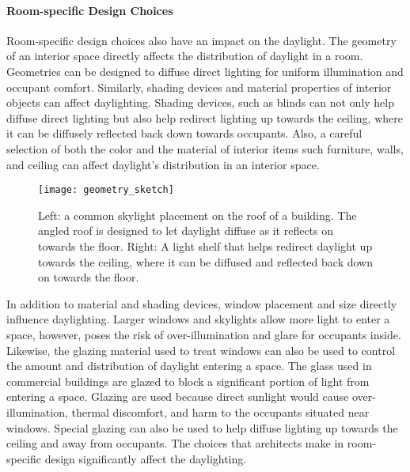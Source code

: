     \paragraph{Room-specific Design Choices} 

    Room-specific design choices also have an impact on the daylight.
    The geometry of an interior space directly affects the distribution of daylight in a room.
    Geometries can be designed to diffuse direct lighting for uniform illumination and occupant comfort.
    Similarly, shading devices and material properties of interior objects can affect daylighting.
    Shading devices, such as blinds can not only help diffuse direct lighting but also help redirect lighting up towards the ceiling, where it can be diffusely reflected back down towards occupants.
    Also, a careful selection of both the color and the material of interior items such furniture, walls, and ceiling can affect daylight's distribution in an interior space. 

    \begin{figure}[h]
      \centering
      \texttt{[image: geometry\_sketch]}
      \caption{Left: a common skylight placement on the roof of a building. The angled roof is designed to let daylight diffuse as it reflects on towards the floor. Right: A light shelf that helps redirect daylight up towards the ceiling, where it can be diffused and reflected back down on towards the floor.}
      \label{fig:geometry_sketch}
    \end{figure}

    In addition to material and shading devices, window placement and size directly influence daylighting.
    Larger windows and skylights allow more light to enter a space, however, poses the risk of over-illumination and glare for occupants inside.
    Likewise, the glazing material used to treat windows can also be used to control the amount and distribution of daylight entering a space.
    The glass used in commercial buildings are glazed to block a significant portion of light from entering a space.
    Glazing are used because direct sunlight would cause over-illumination, thermal discomfort, and harm to the occupants situated near windows.
    Special glazing can also be used to help diffuse lighting up towards the ceiling and away from occupants.
    The choices that architects make in room-specific design significantly affect the daylighting.\\

